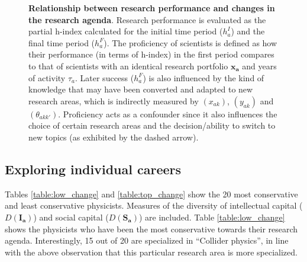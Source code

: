 \documentclass{article}
\begin{document}
\begin{figure}[H]
    \caption{\textbf{Relationship between research performance and changes in the research agenda}. Research performance is evaluated as the partial h-index calculated for the initial time period ($h_a^I$) and the final time period ($h_a^F$). The proficiency of scientists is defined as how their performance (in terms of h-index) in the first period compares to that of scientists with an identical research portfolio $\bm{x_a}$ and years of activity $\tau_a$. Later success ($h_a^F$) is also influenced by the kind of knowledge that may have been converted and adapted to new research areas, which is indirectly measured by $(x_{ak})$, $(y_{ak})$ and $(\theta_{akk'})$. Proficiency acts as a confounder since it also influences the choice of certain research areas and the decision/ability to switch to new topics (as exhibited by the dashed arrow). }
    \label{fig:outcomes_causal_dag}

\end{figure}

\subsection{\label{appendix:cases}Exploring individual careers}

 Tables \ref{table:low_change} and \ref{table:top_change} show the 20 most conservative and least conservative physicists. Measures of the diversity of intellectual capital ($D(\bm{I_a})$) and social capital ($D(\bm{S_a})$) are included. Table \ref{table:low_change} shows the physicists who have been the most conservative towards their research agenda. Interestingly, 15 out of 20 are specialized in ``Collider physics'', in line with the above observation that this particular research area is more specialized.
\end{document}
